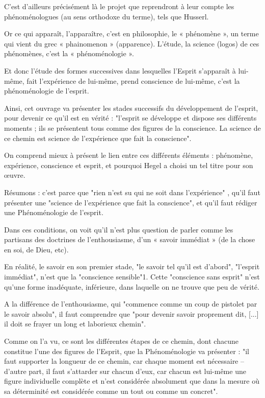 C’est d’ailleurs précisément là le projet que reprendront à leur compte les phénoménologues (au sens orthodoxe du terme), tels que Husserl.

Or ce qui apparaît, l’apparaître, c’est en philosophie, le « phénomène », un terme qui vient du grec « phainomenon » (apparence). L’étude, la science (logos) de ces phénomènes, c’est la « phénoménologie ».

Et donc l’étude des formes successives dans lesquelles l’Esprit s’apparaît à lui-même, fait l’expérience de lui-même, prend conscience de lui-même, c’est la phénoménologie de l’esprit.

Ainsi, cet ouvrage va présenter les stades successifs du développement de l’esprit, pour devenir ce qu’il est en vérité : "l’esprit se développe et dispose ses différents moments ; ils se présentent tous comme des figures de la conscience. La science de ce chemin est science de l’expérience que fait la conscience".

On comprend mieux à présent le lien entre ces différents éléments : phénomène, expérience, conscience et esprit, et pourquoi Hegel a choisi un tel titre pour son œuvre.

Résumons : c’est parce que "rien n’est su qui ne soit dans l’expérience" , qu’il faut présenter une "science de l’expérience que fait la conscience", et qu’il faut rédiger une Phénoménologie de l’esprit.

Dans ces conditions, on voit qu’il n'est plus question de parler comme les partisans des doctrines de l’enthousiasme, d’un « savoir immédiat » (de la chose en soi, de Dieu, etc).

En réalité, le savoir en son premier stade, "le savoir tel qu’il est d’abord", "l’esprit immédiat", n’est que la "conscience sensible"1. Cette "conscience sans esprit" n’est qu’une forme inadéquate, inférieure, dans laquelle on ne trouve que peu de vérité.

A la différence de l’enthousiasme, qui "commence comme un coup de pistolet par le savoir absolu", il faut comprendre que "pour devenir savoir proprement dit, [...] il doit se frayer un long et laborieux chemin".

Comme on l’a vu, ce sont les différentes étapes de ce chemin, dont chacune constitue l’une des figures de l’Esprit, que la Phénoménologie va présenter : "il faut supporter la longueur de ce chemin, car chaque moment est nécessaire – d’autre part, il faut s’attarder sur chacun d’eux, car chacun est lui-même une figure individuelle complète et n’est considérée absolument que dans la mesure où sa déterminité est considérée comme un tout ou comme un concret".

